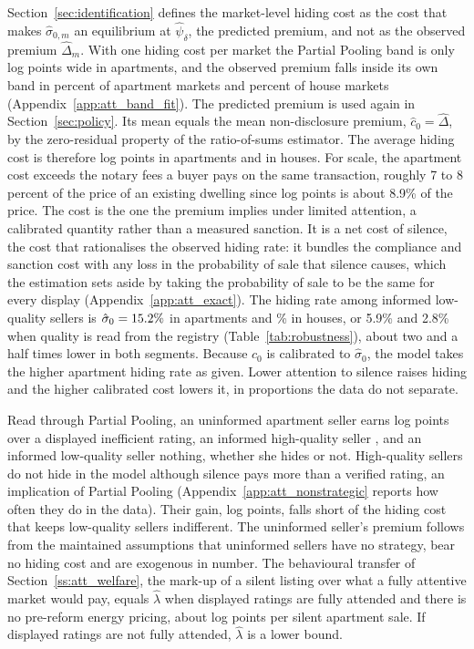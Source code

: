 Section~\ref{sec:identification} defines the market-level hiding cost as the cost that makes $\hat\sigma_{0,m}$ an equilibrium at $\hat\psi_\delta$, the predicted premium, and not as the observed premium $\hat\Delta_m$. With one hiding cost per market the Partial Pooling band is only \attBandWidthApt{} log points wide in apartments, and the observed premium falls inside its own band in \attShareInBandApt{} percent of apartment markets and \attShareInBandHouse{} percent of house markets (Appendix~\ref{app:att_band_fit}). The predicted premium is used again in Section~\ref{sec:policy}. Its mean equals the mean non-disclosure premium, $\hat c_0=\hat\Delta$, by the zero-residual property of the ratio-of-sums estimator. The average hiding cost is therefore \attDthreeApt{} log points in apartments and \attDthreeHouse{} in houses. For scale, the apartment cost exceeds the notary fees a buyer pays on the same transaction, roughly 7 to 8 percent of the price of an existing dwelling since \attDthreeApt{} log points is about 8.9\% of the price. The cost is the one the premium implies under limited attention, a calibrated quantity rather than a measured sanction. It is a net cost of silence, the cost that rationalises the observed hiding rate: it bundles the compliance and sanction cost with any loss in the probability of sale that silence causes, which the estimation sets aside by taking the probability of sale to be the same for every display (Appendix~\ref{app:att_exact}). The hiding rate among informed low-quality sellers is $\hat\sigma_0=15.2{}\%$ in apartments and \attSigmaObsHouse{}\% in houses, or 5.9\% and 2.8\% when quality is read from the registry (Table~\ref{tab:robustness}), about two and a half times lower in both segments. Because $c_0$ is calibrated to $\hat\sigma_0$, the model takes the higher apartment hiding rate as given. Lower attention to silence raises hiding and the higher calibrated cost lowers it, in proportions the data do not separate.

Read through Partial Pooling, an uninformed apartment seller earns \attDthreeApt{} log points over a displayed inefficient rating, an informed high-quality seller \attBthreeApt{}, and an informed low-quality seller nothing, whether she hides or not. High-quality sellers do not hide in the model although silence pays more than a verified rating, an implication of Partial Pooling (Appendix~\ref{app:att_nonstrategic} reports how often they do in the data). Their gain, \attExcessApt{} log points, falls short of the hiding cost \attDthreeApt{} that keeps low-quality sellers indifferent. The uninformed seller's premium follows from the maintained assumptions that uninformed sellers have no strategy, bear no hiding cost and are exogenous in number. The behavioural transfer of Section~\ref{ss:att_welfare}, the mark-up of a silent listing over what a fully attentive market would pay, equals $\hat\lambda$ when displayed ratings are fully attended and there is no pre-reform energy pricing, about \attLamApt{} log points per silent apartment sale. If displayed ratings are not fully attended, $\hat\lambda$ is a lower bound.




